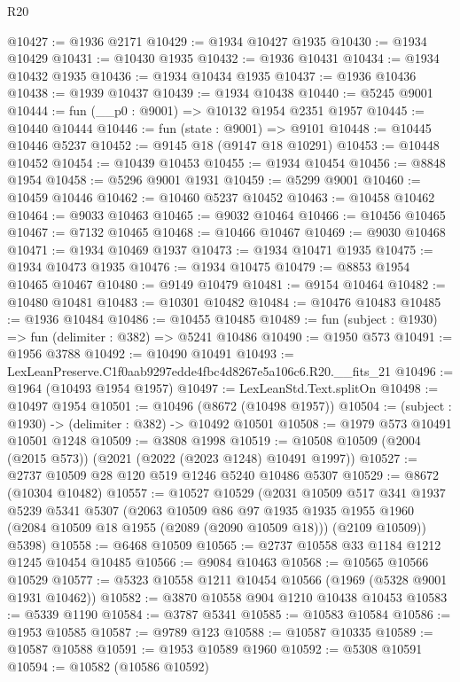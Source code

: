 \begin{lexlean}{R20}
\begin{coremodule}
@10427 := @1936 @2171
@10429 := @1934 @10427 @1935
@10430 := @1934 @10429
@10431 := @10430 @1935
@10432 := @1936 @10431
@10434 := @1934 @10432 @1935
@10436 := @1934 @10434 @1935
@10437 := @1936 @10436
@10438 := @1939 @10437
@10439 := @1934 @10438
@10440 := @5245 @9001
@10444 := fun (__p0 : @9001) => @10132 @1954 @2351 @1957
@10445 := @10440 @10444
@10446 := fun (state : @9001) => @9101
@10448 := @10445 @10446 @5237
@10452 := @9145 @18 (@9147 @18 @10291)
@10453 := @10448 @10452
@10454 := @10439 @10453
@10455 := @1934 @10454
@10456 := @8848 @1954
@10458 := @5296 @9001 @1931
@10459 := @5299 @9001
@10460 := @10459 @10446
@10462 := @10460 @5237 @10452
@10463 := @10458 @10462
@10464 := @9033 @10463
@10465 := @9032 @10464
@10466 := @10456 @10465
@10467 := @7132 @10465
@10468 := @10466 @10467
@10469 := @9030 @10468
@10471 := @1934 @10469 @1937
@10473 := @1934 @10471 @1935
@10475 := @1934 @10473 @1935
@10476 := @1934 @10475
@10479 := @8853 @1954 @10465 @10467
@10480 := @9149 @10479
@10481 := @9154 @10464
@10482 := @10480 @10481
@10483 := @10301 @10482
@10484 := @10476 @10483
@10485 := @1936 @10484
@10486 := @10455 @10485
@10489 := fun (subject : @1930) => fun (delimiter : @382) => @5241 @10486
@10490 := @1950 @573
@10491 := @1956 @3788
@10492 := @10490 @10491
@10493 := LexLeanPreserve.C1f0aab9297edde4fbc4d8267e5a106c6.R20.__fits_21
@10496 := @1964 (@10493 @1954 @1957)
@10497 := LexLeanStd.Text.splitOn
@10498 := @10497 @1954
@10501 := @10496 (@8672 (@10498 @1957))
@10504 := (subject : @1930) -> (delimiter : @382) -> @10492 @10501
@10508 := @1979 @573 @10491 @10501 @1248
@10509 := @3808 @1998
@10519 := @10508 @10509 (@2004 (@2015 @573)) (@2021 (@2022 (@2023 @1248) @10491 @1997))
@10527 := @2737 @10509 @28 @120 @519 @1246 @5240 @10486 @5307
@10529 := @8672 (@10304 @10482)
@10557 := @10527
    @10529
    (@2031
      @10509
      @517
      @341
      @1937
      @5239
      @5341
      @5307
      (@2063
        @10509
        @86
        @97
        @1935
        @1935
        @1955
        @1960
        (@2084 @10509 @18 @1955 (@2089 (@2090 @10509 @18)))
        (@2109 @10509))
      @5398)
@10558 := @6468 @10509
@10565 := @2737 @10558 @33 @1184 @1212 @1245 @10454 @10485
@10566 := @9084 @10463
@10568 := @10565 @10566 @10529
@10577 := @5323 @10558 @1211 @10454 @10566 (@1969 (@5328 @9001 @1931 @10462))
@10582 := @3870 @10558 @904 @1210 @10438 @10453
@10583 := @5339 @1190
@10584 := @3787 @5341
@10585 := @10583 @10584
@10586 := @1953 @10585
@10587 := @9789 @123
@10588 := @10587 @10335
@10589 := @10587 @10588
@10591 := @1953 @10589 @1960
@10592 := @5308 @10591
@10594 := @10582 (@10586 @10592)

\end{coremodule}
\end{lexlean}
